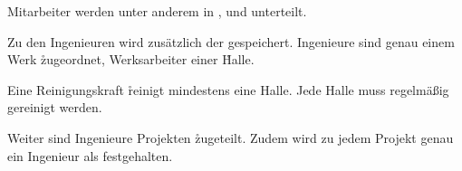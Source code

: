 \documentclass{lehramt-informatik-aufgabe}
\begin{document}
\bigskip

Mitarbeiter werden unter anderem
in ,  und 
unterteilt.

\bigskip

Zu den Ingenieuren wird zusätzlich der
 gespeichert. Ingenieure sind genau einem Werk
\r{zugeordnet}, Werksarbeiter einer \r{Halle}.

\bigskip

Eine Reinigungskraft
\r{reinigt} mindestens eine Halle. Jede Halle muss regelmäßig gereinigt
werden.

\bigskip

Weiter sind Ingenieure Projekten \r{zugeteilt}. Zudem wird zu
jedem Projekt genau ein Ingenieur als  festgehalten.
\end{document}
